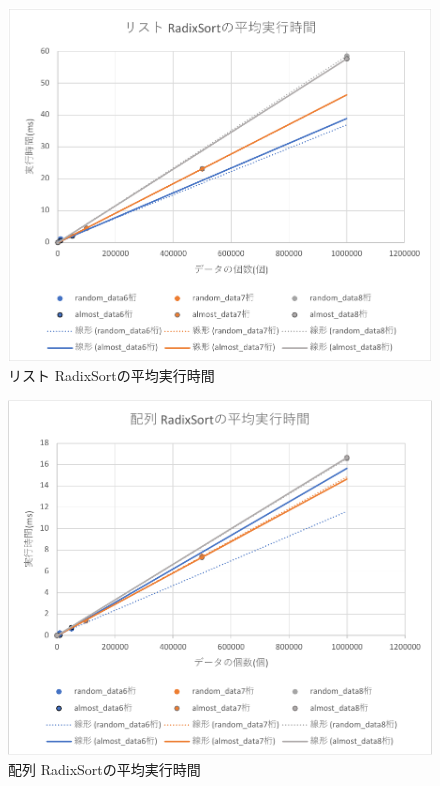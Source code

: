 \documentclass[a4j,dvipdfmx]{jsreport}
\begin{document}
 \begin{figure}[htbp]
    \centering
    \includegraphics[keepaspectratio,width=\linewidth]{figure3.pdf}
    \caption{リスト RadixSortの平均実行時間}
    \label{fig:RS1}
\end{figure}

 \begin{figure}[H]
    \centering
    \includegraphics[keepaspectratio,width=\linewidth]{figure4.pdf}
    \caption{配列 RadixSortの平均実行時間}
    \label{fig:RS2}
\end{figure}
\end{document}
